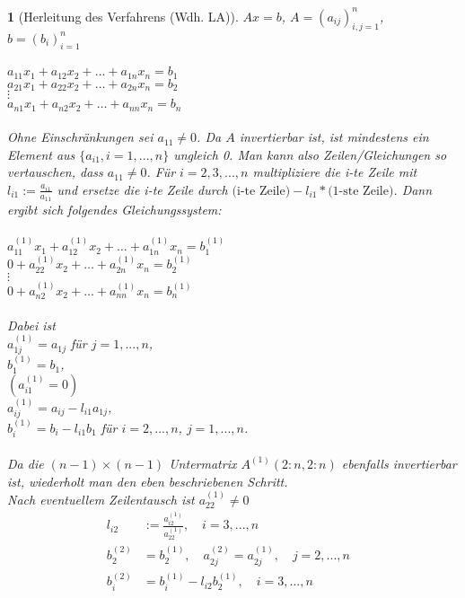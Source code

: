 \documentclass[12pt]{article}
\theoremstyle{break}
\newtheorem{nothing}[theorem]{}
\begin{document}
\begin{nothing}[Herleitung des Verfahrens (Wdh. LA)]
$Ax = b$, $A = (a_{ij})_{i,j = 1}^n$, $b = (b_i)_{i=1}^n$\\\\
%
$a_{11} x_1 + a_{12}x_2 + \dots + a_{1n}x_n = b_1$\\
$a_{21} x_1 + a_{22}x_2 + \dots + a_{2n}x_n = b_2$\\
$\vdots$ \\
$a_{n1} x_1 + a_{n2}x_2 + \dots + a_{nn}x_n = b_n$\\\\
%
Ohne Einschränkungen sei $a_{11} \neq 0 $. Da $A$ invertierbar ist, ist mindestens ein Element aus $\{a_{i1}, i=1,...,n\}$ ungleich 0. Man kann also Zeilen/Gleichungen so vertauschen, dass $a_{11} \neq 0$. Für $i=2,3,...,n$ multipliziere die i-te Zeile mit $l_{i1} := \frac{a_{i1}}{a_{11}}$ und ersetze die i-te Zeile durch $\text{(i-te Zeile)} - l_{i1} * \text{(1-ste Zeile)}$. Dann ergibt sich folgendes Gleichungssystem: \\\\
%
$a_{11}^{(1)} x_1 + a_{12}^{(1)}x_2 + \dots + a_{1n}^{(1)}x_n = b_1^{(1)}$\\
$0 + a_{22}^{(1)}x_2 + \dots + a_{2n}^{(1)}x_n = b_2^{(1)}$\\
$\vdots$ \\
$0+ a_{n2}^{(1)}x_2 + \dots + a_{nn}^{(1)}x_n = b_n^{(1)}$\\\\
%
Dabei ist\\
$a_{1j}^{(1)} = a_{1j}$ für $j=1,...,n$, \\
$b_1^{(1)} = b_1$, \\
$(a_{i1}^{(1)} = 0)$\\
$a_{ij}^{(1)} = a_{ij} - l_{i1} a_{1j}$,\\
$b_i^{(1)} = b_i - l_{i1} b_1$ für $i=2,...,n$, $j=1,...,n$.\\\\
%
Da die $(n-1)\times (n-1)$ Untermatrix $A^{(1)} (2:n, 2:n)$ ebenfalls invertierbar ist, wiederholt man den eben beschriebenen Schritt.\\
Nach eventuellem Zeilentausch ist $a_{22}^{(1)} \neq 0$
%
\begin{align*}
l_{i2} &:= \frac{a_{i2}^{(1)}}{a_{22}^{(1)}}, \quad i=3,...,n &\\
b_2^{(2)} &= b_2^{(1)}, \quad a_{2j}^{(2)} = a_{2j}^{(1)}, \quad j=2,...,n &\\
b_i^{(2)} &= b_i^{(1)} - l_{i2} b_2^{(1)}, \quad i=3,...,n &\\

\end{align*}
\end{nothing}
\end{document}
